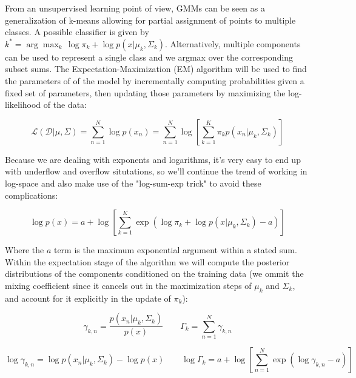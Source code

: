 \documentclass{article}
\begin{document}
From an unsupervised learning point of view, GMMs can be seen as a generalization of k-means allowing for partial assignment of points to multiple classes. A possible classifier is given by $k^{*} = \arg\max_k \, \log \pi_{k} + \log p(x \lvert \mu_k, \Sigma_k)$. Alternatively, multiple components can be used to represent a single class and we argmax over the corresponding subset sums. The Expectation-Maximization (EM) algorithm will be used to find the parameters of of the model by incrementally computing probabilities given a fixed set of parameters, then updating those parameters by maximizing the log-likelihood of the data:

\begin{equation}
	\mathcal{L} \left( \mathcal{D} \lvert \mu, \Sigma \right) = \sum_{n = 1}^{N} \log p(x_n) = \sum_{n=1}^{N} \log{ \left [ \sum_{k = 1}^{K} \pi_{k} p \left( x_n \lvert \mu_k, \Sigma_k \right ) \right ] }
	\label{eqn:loglikelihood}
\end{equation}

Because we are dealing with exponents and logarithms, it's very easy to end up with underflow and overflow situtations, so we'll continue the trend of working in log-space and also make use of the "log-sum-exp trick" to avoid these complications:

\begin{equation}
	\log p( x ) = a + \log \left[ \sum_{k = 1}^{K} \exp{ \left( \log \pi_{k} + \log p(x \lvert \mu_k, \Sigma_k) - a \right ) } \right ]
\end{equation}

Where the $a$ term is the maximum exponential argument within a stated sum. Within the expectation stage of the algorithm we will compute the posterior distributions of the components conditioned on the training data (we ommit the mixing coefficient since it cancels out in the maximization steps of $\mu_k$ and $\Sigma_k$, and account for it explicitly in the update of $\pi_k$):

\begin{equation}
	\gamma_{k, n} = \frac{ p \left ( x_n \lvert \mu_k, \Sigma_k \right ) }{ p(x) } \qquad \Gamma_k = \sum_{n=1}^{N} \gamma_{k, n}
\end{equation}

\begin{equation}
	\log \gamma_{k, n} =  \log p \left ( x_n \lvert \mu_k, \Sigma_k \right )  - \log p(x) \qquad \log \Gamma_k = a + \log \left [ \sum_{n=1}^{N} \exp{ \left( \log \gamma_{k, n} - a \right )} \right ]
\end{equation}
\end{document}
